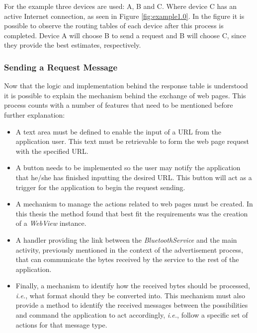 For the example three devices are used: A, B and C. Where device C has an active Internet connection, as seen in Figure \ref{fig:example1.0}. In the figure it is possible to observe the routing tables of each device after this process is completed. Device A will choose B to send a request and B will choose C, since they provide the best estimates, respectively.


\subsubsection{Sending a Request Message}
\label{subsubsec:sendrqt}

Now that the logic and implementation behind the response table is understood it is possible to explain the mechanism behind the exchange of web pages. This process counts with a number of features that need to be mentioned before further explanation:

\begin{itemize}
	\item  A text area must be defined to enable the input of a \gls{URL} from the application user. This text must be retrievable to form the web page request with the specified \gls{URL}.
	
	\item A button needs to be implemented so the user may notify the application that he/she has finished inputting the desired \gls{URL}. This button will act as a trigger for the application to begin the request sending.
	
	\item A mechanism to manage the actions related to web pages must be created. In this thesis the method found that best fit the requirements was the creation of a \textit{WebView} instance.
	
	\item A handler providing the link between the \textit{BluetoothService} and the main activity, previously mentioned in the context of the advertisement process, that can communicate the bytes received by the service to the rest of the application.
	
	\item Finally, a mechanism to identify how the received bytes should be processed, \textit{i.e.}, what format should they be converted into. This mechanism must also provide a method to identify the received messages between the possibilities and command the application to act accordingly, \textit{i.e.}, follow a specific set of actions for that message type.
\end{itemize}

